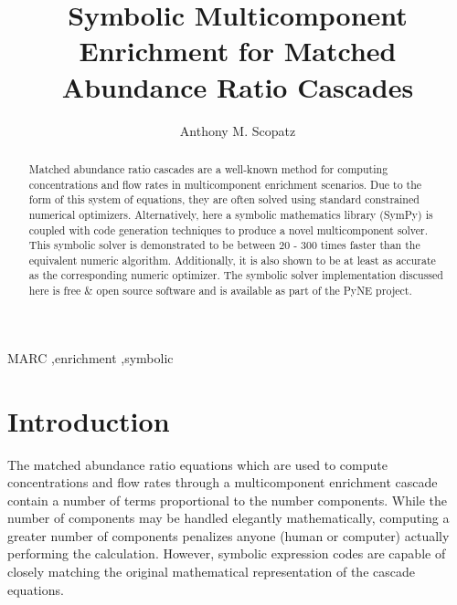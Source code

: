 \documentclass[preprint,12pt]{elsarticle}
\begin{document}
\begin{frontmatter}
\title{Symbolic Multicomponent Enrichment for Matched Abundance Ratio Cascades}

\author[chi]{Anthony M. Scopatz}

\address[chi]{The University of Chicago, The FLASH Center, 
              5754 S. Ellis Ave, Chicago, IL, 60637}

\begin{abstract}
Matched abundance ratio cascades are a well-known method for computing concentrations
and flow rates in multicomponent enrichment scenarios.  Due to the form of this 
system 
of equations, they are often solved using standard constrained numerical 
optimizers.  Alternatively, here a symbolic mathematics library (SymPy) is 
coupled with 
code generation techniques to produce a novel multicomponent solver.  This symbolic 
solver is demonstrated to be between 20 - 300 times faster than the equivalent 
numeric algorithm.
Additionally, it is also shown to be at least as accurate as the corresponding 
numeric optimizer.  The 
symbolic solver implementation discussed here is free \& open source software and 
is available as part of the PyNE project.
\end{abstract}

\begin{keyword}
MARC \sep enrichment \sep symbolic
\end{keyword}

\end{frontmatter}


%
%

\section{Introduction}
\label{sec:intro}

The matched abundance ratio equations which are used to compute concentrations and 
flow rates through a multicomponent enrichment cascade contain a number of terms 
proportional to the number components.  While the number of components may be 
handled elegantly mathematically, computing a greater number of components 
penalizes anyone (human or computer) actually performing the 
calculation.  However, 
symbolic expression codes are capable of closely matching the original 
mathematical representation of the cascade equations.
\end{document}
